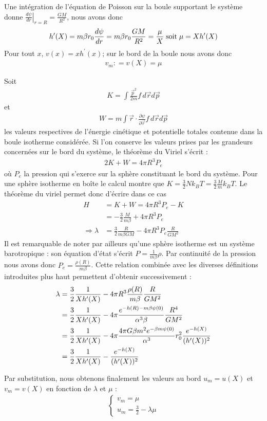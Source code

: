 	Une intégration de l'équation de Poisson sur la boule supportant le système donne $\left.\frac{d \psi}{dr}
	\right|_{r=R}= \frac{GM}{R^2}$, nous avons donc 
	\begin{align*}
		h'(X) = m\beta r_0 \frac{d \psi}{dr} = m\beta r_0 \frac{GM}{R^2} = \frac{\mu}{X} \;\textrm{soit}\; \mu = Xh'(X)
	\end{align*}
	Pour tout $x$, $v(x)=xh^{\prime}(x)$; sur le bord de la boule nous avons donc
	\begin{align}
		 v_m: = v\left(X\right) = \mu\label{vmmu}
	\end{align}

	Soit 
	\begin{align*}K=\int \frac{\vec{p}^2}{2m}f\, d\vec{r}d\vec{p}\end{align*}
	et 
	\begin{align*}W=m\int \vec{r}\cdot \frac{\partial \psi}{\partial \vec{r}}f\, d\vec{r}d\vec{p}\end{align*}
	les valeurs respectives de l'énergie cinétique et potentielle totales contenue dans la boule isotherme considérée. Si l'on conserve les valeurs prises par les grandeurs concernées sur le bord du système, le théorème du Viriel  s'écrit :
	\begin{align}
		2K + W = 4\pi R^3 P_e \label{virielinabox}
	\end{align}
	 où $P_e$ la pression qui s'exerce sur la sphère constituant le bord du système.
	Pour une sphère isotherme en boîte  le calcul montre que \mbox{$K = \frac{3}{2} N k_B T = \frac{3}{2} \frac{M}{m} k_B T$}. Le théorème du viriel permet donc d'écrire dans ce cas 
	\begin{align*}
		H &= K + W =  4\pi R^3 P_e - K \\
		  &= -\frac{3}{2} \frac{M}{m\beta} + 4\pi R^3 P_e \\
		\Rightarrow \lambda &= \frac{3}{2}\frac{R}{m\beta GM} - 4\pi R^3 P_e \frac{R}{GM^2}
	\end{align*}
	Il est remarquable de noter par ailleurs qu'une sphère isotherme est un système barotropique : son équation d'état s'écrit $P=\frac{1}{m\beta}\rho$. Par continuité de la pression nous avons donc $P_e = \frac{\rho(R)}{m\beta}$. Cette relation combinée avec les diverses définitions introduites plus haut permettent d'obtenir successivement  :
	\begin{align}
		\lambda &= \frac{3}{2}\frac{1}{Xh'(X)} - 4\pi R^3 \frac{\rho(R)}{m\beta} \frac{R}{GM^2} \notag \\
			&= \frac{3}{2}\frac{1}{Xh'(X)} - 4\pi \frac{e^{-h(R) - m\beta\psi(0)}}{\alpha^3\beta} \frac{R^4}{GM^2} \notag \\
			&= \frac{3}{2}\frac{1}{Xh'(X)} - 4\pi  \frac{4\pi G \beta m^2 e^{-\beta m \psi(0)}}{\alpha^3} r_0^2\frac{e^{-h(X)}}{(h'(X))^2} \notag \\
			&= \frac{3}{2}\frac{1}{Xh'(X)} - \frac{e^{-h(X)}}{(h'(X))^2}\label{lamum}
	\end{align}

	Par substitution, nous obtenons finalement les valeurs au bord $u_m=u(X)$ et $v_m=v(X)$ en fonction de $\lambda$ et $\mu$ :
	\begin{align}
		\label{uv_max}
		\left\{\begin{array}{l}
			v_m = \mu \\
			u_m = \frac{3}{2} - \lambda \mu
		\end{array}\right.
	\end{align}

